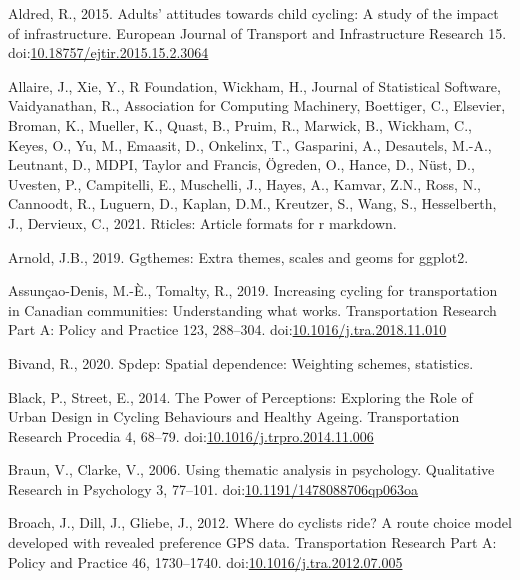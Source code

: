 \documentclass[]{elsarticle} %
\begin{document}
\leavevmode\hypertarget{ref-aldredAdultsAttitudesChild2015}{}%
Aldred, R., 2015. Adults' attitudes towards child cycling: A study of
the impact of infrastructure. European Journal of Transport and
Infrastructure Research 15.
doi:\href{https://doi.org/10.18757/ejtir.2015.15.2.3064}{10.18757/ejtir.2015.15.2.3064}

\leavevmode\hypertarget{ref-R-rticles}{}%
Allaire, J., Xie, Y., R Foundation, Wickham, H., Journal of Statistical
Software, Vaidyanathan, R., Association for Computing Machinery,
Boettiger, C., Elsevier, Broman, K., Mueller, K., Quast, B., Pruim, R.,
Marwick, B., Wickham, C., Keyes, O., Yu, M., Emaasit, D., Onkelinx, T.,
Gasparini, A., Desautels, M.-A., Leutnant, D., MDPI, Taylor and Francis,
Ögreden, O., Hance, D., Nüst, D., Uvesten, P., Campitelli, E.,
Muschelli, J., Hayes, A., Kamvar, Z.N., Ross, N., Cannoodt, R., Luguern,
D., Kaplan, D.M., Kreutzer, S., Wang, S., Hesselberth, J., Dervieux, C.,
2021. Rticles: Article formats for r markdown.

\leavevmode\hypertarget{ref-R-ggthemes}{}%
Arnold, J.B., 2019. Ggthemes: Extra themes, scales and geoms for
ggplot2.

\leavevmode\hypertarget{ref-assuncao-denisIncreasingCyclingTransportation2019a}{}%
Assunçao-Denis, M.-È., Tomalty, R., 2019. Increasing cycling for
transportation in Canadian communities: Understanding what works.
Transportation Research Part A: Policy and Practice 123, 288--304.
doi:\href{https://doi.org/10.1016/j.tra.2018.11.010}{10.1016/j.tra.2018.11.010}

\leavevmode\hypertarget{ref-R-spdep}{}%
Bivand, R., 2020. Spdep: Spatial dependence: Weighting schemes,
statistics.

\leavevmode\hypertarget{ref-blackPowerPerceptionsExploring2014a}{}%
Black, P., Street, E., 2014. The Power of Perceptions: Exploring the
Role of Urban Design in Cycling Behaviours and Healthy Ageing.
Transportation Research Procedia 4, 68--79.
doi:\href{https://doi.org/10.1016/j.trpro.2014.11.006}{10.1016/j.trpro.2014.11.006}

\leavevmode\hypertarget{ref-braunUsingThematicAnalysis2006}{}%
Braun, V., Clarke, V., 2006. Using thematic analysis in psychology.
Qualitative Research in Psychology 3, 77--101.
doi:\href{https://doi.org/10.1191/1478088706qp063oa}{10.1191/1478088706qp063oa}

\leavevmode\hypertarget{ref-broachWhereCyclistsRide2012}{}%
Broach, J., Dill, J., Gliebe, J., 2012. Where do cyclists ride? A route
choice model developed with revealed preference GPS data. Transportation
Research Part A: Policy and Practice 46, 1730--1740.
doi:\href{https://doi.org/10.1016/j.tra.2012.07.005}{10.1016/j.tra.2012.07.005}
\end{document}
